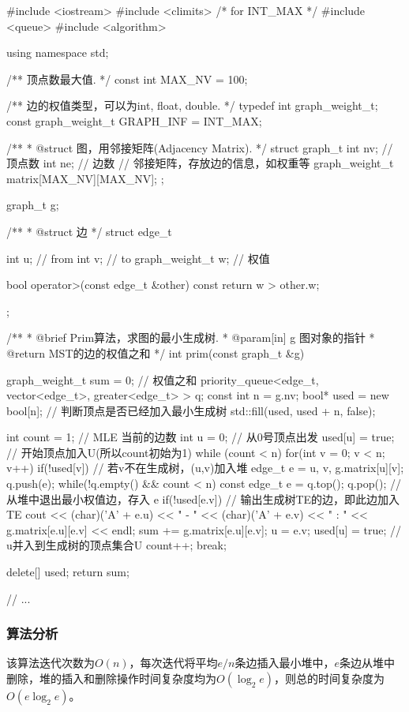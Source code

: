 \begin{Codex}[label=am_graph_prim2.cpp]
#include <iostream>
#include <climits>  /* for INT_MAX */
#include <queue>
#include <algorithm>

using namespace std;

/** 顶点数最大值. */
const int MAX_NV = 100;

/** 边的权值类型，可以为int, float, double. */
typedef int graph_weight_t;
const graph_weight_t GRAPH_INF = INT_MAX;

/**
 * @struct 图，用邻接矩阵(Adjacency Matrix).
 */
struct graph_t {
    int nv; // 顶点数
    int ne; // 边数
    // 邻接矩阵，存放边的信息，如权重等
    graph_weight_t matrix[MAX_NV][MAX_NV];
};

graph_t g;

/**
 * @struct 边
 */
struct edge_t{
    int u;  // from
    int v;  // to
    graph_weight_t w;  // 权值

    bool operator>(const edge_t &other) const {
        return w > other.w;
    }
};

/**
  * @brief Prim算法，求图的最小生成树.
  * @param[in] g 图对象的指针
  * @return MST的边的权值之和
  */
int prim(const graph_t &g){
    graph_weight_t sum = 0; // 权值之和
    priority_queue<edge_t, vector<edge_t>, greater<edge_t> > q;
    const int n = g.nv;
    bool* used = new bool[n];  // 判断顶点是否已经加入最小生成树
    std::fill(used, used + n, false);

    int count = 1;  // MLE 当前的边数
    int u = 0;      // 从0号顶点出发
    used[u] = true;    // 开始顶点加入U(所以count初始为1)
    while (count < n) {
        for(int v = 0; v < n; v++) if(!used[v]) { // 若v不在生成树，(u,v)加入堆
            edge_t e = {u, v, g.matrix[u][v]};
            q.push(e);
        }
        while(!q.empty() && count < n) {
            const edge_t e = q.top(); q.pop();  // 从堆中退出最小权值边，存入 e
            if(!used[e.v]) {
                // 输出生成树TE的边，即此边加入TE
                cout << (char)('A' + e.u) << " - " << (char)('A' + e.v) <<
                        " : " << g.matrix[e.u][e.v] << endl;
                sum += g.matrix[e.u][e.v];
                u = e.v;
                used[u] = true; // u并入到生成树的顶点集合U
                count++;
                break;
            }
        }
    }

    delete[] used;
    return sum;
}

// ...
\end{Codex}

\subsubsection{算法分析}
该算法迭代次数为$O(n)$，每次迭代将平均$e/n$条边插入最小堆中，$e$条边从堆中删除，堆的插入和删除操作时间复杂度均为$O(\log_2 e)$，则总的时间复杂度为 $O(e\log_2e)$。

